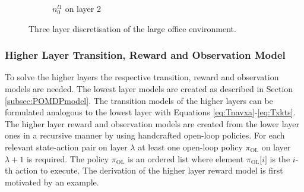 \begin{figure}
\begin{subfigure}[b]{0.23\textwidth}
        \caption{$n_0^{l1}$ on layer 2}
        \label{subfig:bigenvl2}
    \end{subfigure}
    \caption{Three layer discretisation of the large office environment.}
    \label{fig:bigenv_3layers}
\end{figure}
\subsubsection{Higher Layer Transition, Reward and Observation Model}
To solve the higher layers the respective transition, reward and observation models are needed. The lowest layer models are created as described in Section \ref{subsec:POMDPmodel}. The transition models of the higher layers can be formulated analogous to the lowest layer with Equations \ref{eq:Tnavxa}-\ref{eq:Txkts}. 
The higher layer reward and observation models are created from the lower layer ones in a recursive manner by using handcrafted open-loop policies. For each relevant state-action pair on layer $\lambda$ at least one open-loop policy $\pi_\text{OL}$ on layer $\lambda+1$ is required. The policy $\pi_\text{OL}$ is an ordered list where element $\pi_\text{OL}\texttt{[$i$]}$ is the $i$-th action to execute. The derivation of the higher layer reward model is first motivated by an example.
